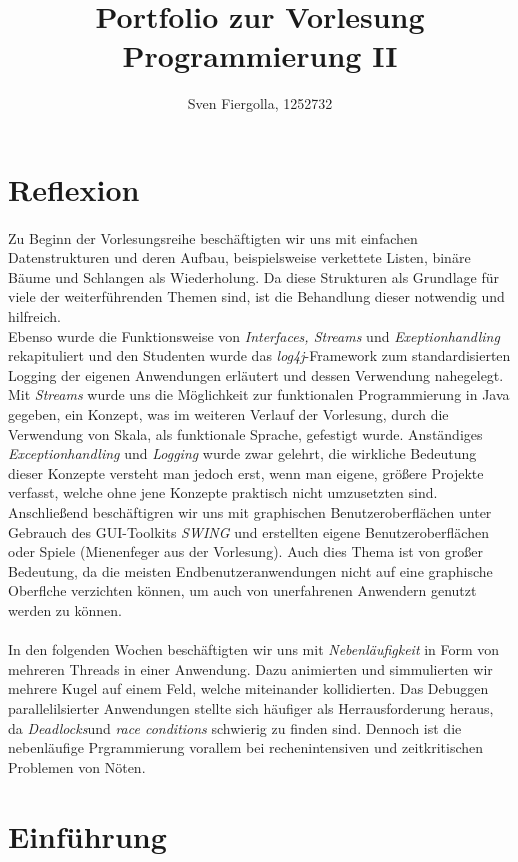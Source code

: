 \documentclass[11pt, a4paper]{article}
\author{Sven Fiergolla, 1252732}
\title{Portfolio zur Vorlesung Programmierung II}
\begin{document}
 

\clearpage\maketitle
\thispagestyle{empty}
\pagebreak


\section*{Reflexion}

\paragraph*{}
Zu Beginn der Vorlesungsreihe beschäftigten wir uns mit einfachen Datenstrukturen und deren Aufbau, beispielsweise verkettete Listen, binäre Bäume und Schlangen als Wiederholung. Da diese Strukturen als Grundlage für viele der weiterführenden Themen sind, ist die Behandlung dieser notwendig und hilfreich.\\
Ebenso wurde die Funktionsweise von \textit{Interfaces, Streams} und \textit{Exeptionhandling} rekapituliert und den Studenten wurde das \textit{log4j}-Framework zum standardisierten Logging der eigenen Anwendungen erläutert und dessen Verwendung nahegelegt. Mit \textit{Streams} wurde uns die Möglichkeit zur funktionalen Programmierung in Java gegeben, ein Konzept, was im weiteren Verlauf der Vorlesung, durch die Verwendung von Skala, als funktionale Sprache, gefestigt wurde. Anständiges \textit{Exceptionhandling} und \textit{Logging} wurde zwar gelehrt, die wirkliche Bedeutung dieser Konzepte versteht man jedoch erst, wenn man eigene, größere Projekte verfasst, welche ohne jene Konzepte praktisch nicht umzusetzten sind.\\
Anschließend beschäftigren wir uns mit graphischen Benutzeroberflächen unter Gebrauch des GUI-Toolkits \textit{SWING} und erstellten eigene Benutzeroberflächen oder Spiele (Mienenfeger aus der Vorlesung). Auch dies Thema ist von großer Bedeutung, da die meisten Endbenutzeranwendungen nicht auf eine graphische Oberflche verzichten können, um auch von unerfahrenen Anwendern genutzt werden zu können.
\par

\paragraph*{}
In den folgenden Wochen beschäftigten wir uns mit \textit{Nebenläufigkeit} in Form von mehreren Threads in einer Anwendung. Dazu animierten und simmulierten wir mehrere Kugel auf einem Feld, welche miteinander kollidierten. Das Debuggen parallelilsierter Anwendungen stellte sich häufiger als Herrausforderung heraus, da \textit{Deadlocks}und \textit{race conditions} schwierig zu finden sind. Dennoch ist die nebenläufige Prgrammierung vorallem bei rechenintensiven und zeitkritischen Problemen von Nöten.\par


\pagebreak
\section*{Einführung}


\pagebreak

\end{document}
